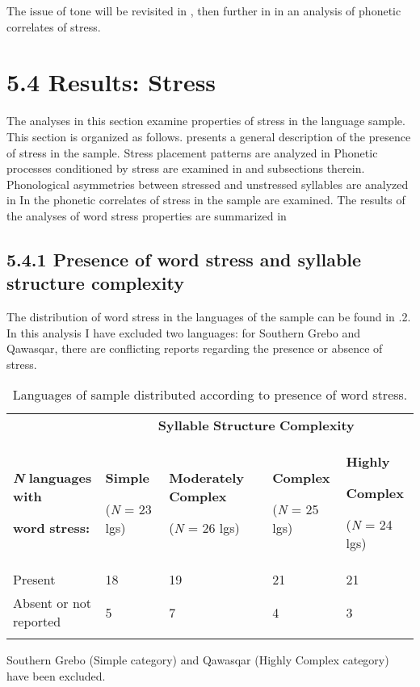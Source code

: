   The issue of tone will be revisited in , then further in  in an analysis of phonetic correlates of stress.


\section{5.4 Results: Stress}

  The analyses in this section examine properties of stress in the language sample. This section is organized as follows.  presents a general description of the presence of stress in the sample. Stress placement patterns are analyzed in  Phonetic processes conditioned by stress are examined in  and subsections therein. Phonological asymmetries between stressed and unstressed syllables are analyzed in  In  the phonetic correlates of stress in the sample are examined. The results of the analyses of word stress properties are summarized in 


\subsection{5.4.1 Presence of word stress and syllable structure complexity}

  The distribution of word stress in the languages of the sample can be found in .2. In this analysis I have excluded two languages: for Southern Grebo and Qawasqar, there are conflicting reports regarding the presence or absence of stress.






\begin{table}
\begin{tabularx}{\textwidth}{XXXXX}
\lsptoprule
 & \multicolumn{4}{c}{ \textbf{Syllable} \textbf{Structure} \textbf{Complexity}}\\
{ \textbf{\textit{N}} \textbf{languages} \textbf{with} }

 \textbf{word} \textbf{stress:} & { \textbf{Simple}}

 (\textit{N} = 23 lgs) & { \textbf{Moderately} \textbf{Complex}}

 (\textit{N} = 26 lgs) & { \textbf{Complex}}

 (\textit{N} = 25 lgs) & { \textbf{Highly} }

{ \textbf{Complex}}

 (\textit{N} = 24 lgs)\\
 Present & 18 & 19 & 21 & 21\\
 Absent or not reported & 5 & 7 & 4 & 3\\
\lspbottomrule
\end{tabularx}
\caption{\label{5.2}Languages of sample distributed according to presence of word stress.}Southern Grebo (Simple category) and Qawasqar (Highly Complex category) have been excluded.
\end{table}




